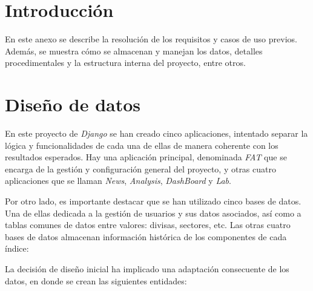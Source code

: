 
\section{Introducción}

En este anexo se describe la resolución de los requisitos y casos de uso previos. Además, se muestra cómo se almacenan y manejan los datos, detalles procedimentales y la estructura interna del proyecto, entre otros.

\section{Diseño de datos}

En este proyecto de \emph{Django} se han creado cinco aplicaciones, intentado separar la lógica y funcionalidades de cada una de ellas de manera coherente con los resultados esperados. Hay una aplicación principal, denominada \emph{FAT} que se encarga de la gestión y configuración general del proyecto, y otras cuatro aplicaciones que se llaman \emph{News}, \emph{Analysis}, \emph{DashBoard} y \emph{Lab}. 

Por otro lado, es importante destacar que se han utilizado cinco bases de datos. Una de ellas  dedicada a la gestión de usuarios y sus datos asociados, así como a tablas comunes de datos entre valores: divisas, sectores, etc. Las otras cuatro bases de datos almacenan información histórica de los componentes de cada índice:


La decisión de diseño inicial ha implicado una adaptación consecuente de los datos, en donde se crean las siguientes entidades:

